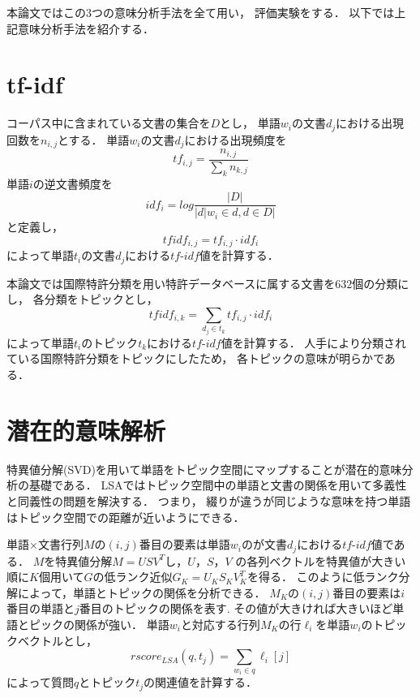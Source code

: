 \documentclass[master]{suribt}
\theoremstyle{definition}
\begin{document}
 本論文ではこの3つの意味分析手法を全て用い，
 評価実験をする．
 以下では上記意味分析手法を紹介する．

 \section{tf-idf}
 コーパス中に含まれている文書の集合を$D$とし，
 単語$w_i$の文書$d_j$における出現回数を$n_{i,j}$とする．
 単語$w_i$の文書$d_j$における出現頻度を
 \begin{equation}
 tf_{i,j} = \frac{n_{i,j}}{\sum_k n_{k,j}}
 \end{equation}
 単語$i$の逆文書頻度を
 \begin{equation}
 idf_i = log \frac{|D|}{|d|w_i \in d, d \in D|}
 \end{equation}
 と定義し，
 \begin{equation}
 tfidf_{i,j} = tf_{i,j} \cdot idf_i
 \end{equation}
 によって単語$t_i$の文書$d_j$における$tf\text{-}idf$値を計算する．
 
 本論文では国際特許分類を用い特許データベースに属する文書を$632$個の分類にし，
 各分類をトピックとし，
 \begin{equation}
 tfidf_{i,k} = \sum_{d_j \in t_k}tf_{i,j} \cdot idf_i
 \end{equation}
 によって単語$t_i$のトピック$t_k$における$tf\text{-}idf$値を計算する．
 人手により分類されている国際特許分類をトピックにしたため，
 各トピックの意味が明らかである．

 \section{潜在的意味解析}
 特異値分解(SVD)を用いて単語をトピック空間にマップすることが潜在的意味分析の基礎である．
 LSAではトピック空間中の単語と文書の関係を用いて多義性と同義性の問題を解決する．
 つまり， 綴りが違うが同じような意味を持つ単語はトピック空間での距離が近いようにできる．

 単語$\times$文書行列$M$の$(i,j)$番目の要素は単語$w_i$のが文書$d_j$における$tf\text{-}idf$値である．
 $M$を特異値分解$M = USV^T$し，$U$，$S$，$V$ の各列ベクトルを特異値が大きい順に$K$個用いて$G$の低ランク近似$G_K=U_KS_KV_{K}^T$を得る．
 このように低ランク分解によって，単語とトピックの関係を分析できる．
 $M_K$の$(i,j)$番目の要素は$i$番目の単語と$j$番目のトピックの関係を表す.
 その値が大きければ大きいほど単語とピックの関係が強い．
 単語$w_i$と対応する行列$M_K$の行$\ell_i$を単語$w_i$のトピックベクトルとし，
 \begin{equation}
 rscore_{LSA}(q,t_j) = \sum_{w_i \in q}\ell_i[j]
 \end{equation}
 によって質問$q$とトピック$t_j$の関連値を計算する．
 
\end{document}
